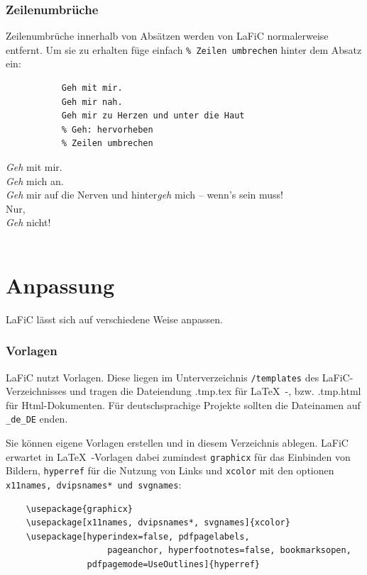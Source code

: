 \documentclass{scrartcl}
\begin{document}
\section{Zeilenumbrüche}

{Zeilenumbrüche  innerhalb von Absätzen werden von LaFiC normalerweise entfernt. Um sie zu erhalten füge einfach \texttt{\% Zeilen umbrechen} hinter dem Absatz ein:\\}

\begin{verbatim}
  	       Geh mit mir.
	       Geh mir nah.
	       Geh mir zu Herzen und unter die Haut
	       % Geh: hervorheben
	       % Zeilen umbrechen
\end{verbatim}


{\emph{Geh} mit mir.\\
\emph{Geh} mich an.\\
\emph{Geh} mir auf die Nerven und hinter\emph{geh} mich – wenn's sein muss!\\
Nur,\\
\emph{Geh} nicht!\\\\}

\part{Anpassung}

{LaFiC lässt sich auf verschiedene Weise anpassen.\\}

\section{Vorlagen}

{LaFiC nutzt Vorlagen. Diese liegen im Unterverzeichnis
\texttt{/templates} des LaFiC-Verzeichnisses und tragen die
Dateiendung .tmp.tex für \LaTeX\ -, bzw. .tmp.html für
Html-Dokumenten. Für deutschsprachige Projekte sollten die
Dateinamen auf \texttt{\_de\_DE} enden.\\}

{Sie können eigene Vorlagen erstellen und in diesem
Verzeichnis ablegen. LaFiC erwartet in \LaTeX\ -Vorlagen
dabei zumindest \texttt{graphicx} für das Einbinden von Bildern,
\texttt{hyperref} für die Nutzung von Links und \texttt{xcolor} mit den
optionen \texttt{x11names, dvipsnames* und svgnames}:\\}

\begin{verbatim}
	\usepackage{graphicx}
	\usepackage[x11names, dvipsnames*, svgnames]{xcolor}
	\usepackage[hyperindex=false, pdfpagelabels,
                    pageanchor, hyperfootnotes=false, bookmarksopen,
	    	    pdfpagemode=UseOutlines]{hyperref}
\end{verbatim}
\end{document}
